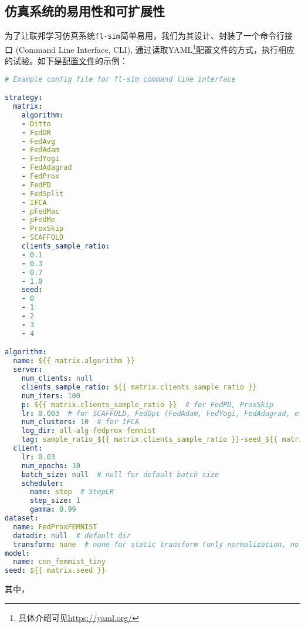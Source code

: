 \subsection{仿真系统的易用性和可扩展性}

为了让联邦学习仿真系统\texttt{fl-sim}简单易用，我们为其设计、封装了一个命令行接口 (Command Line Interface, CLI), 通过读取YAML\footnote{具体介绍可见\url{https://yaml.org/}}配置文件的方式，执行相应的试验。如下是\href{https://github.com/wenh06/fl-sim/blob/master/example-configs/all-alg-fedprox-femnist.yml}{配置文件}的示例：
\begin{lstlisting}[language=yaml, caption={一份典型的联邦学习仿真系统\texttt{fl-sim}命令行接口配置文件},label={lst:fl-sim-config}]
# Example config file for fl-sim command line interface

strategy:
  matrix:
    algorithm:
    - Ditto
    - FedDR
    - FedAvg
    - FedAdam
    - FedYogi
    - FedAdagrad
    - FedProx
    - FedPD
    - FedSplit
    - IFCA
    - pFedMac
    - pFedMe
    - ProxSkip
    - SCAFFOLD
    clients_sample_ratio:
    - 0.1
    - 0.3
    - 0.7
    - 1.0
    seed:
    - 0
    - 1
    - 2
    - 3
    - 4

algorithm:
  name: ${{ matrix.algorithm }}
  server:
    num_clients: null
    clients_sample_ratio: ${{ matrix.clients_sample_ratio }}
    num_iters: 100
    p: ${{ matrix.clients_sample_ratio }}  # for FedPD, ProxSkip
    lr: 0.003  # for SCAFFOLD, FedOpt (FedAdam, FedYogi, FedAdagrad, etc.), this parameter is quite sensitive
    num_clusters: 10  # for IFCA
    log_dir: all-alg-fedprox-femnist
    tag: sample_ratio_${{ matrix.clients_sample_ratio }}-seed_${{ matrix.seed }}
  client:
    lr: 0.03
    num_epochs: 10
    batch_size: null  # null for default batch size
    scheduler:
      name: step  # StepLR
      step_size: 1
      gamma: 0.99
dataset:
  name: FedProxFEMNIST
  datadir: null  # default dir
  transform: none  # none for static transform (only normalization, no augmentation)
model:
  name: cnn_femmist_tiny
seed: ${{ matrix.seed }}
\end{lstlisting}
其中，

